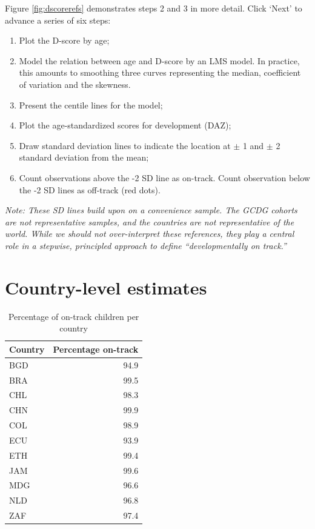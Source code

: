 \documentclass[
]{book}
\providecommand{\tightlist}{%
  \setlength{\itemsep}{0pt}\setlength{\parskip}{0pt}}
\begin{document}
Figure \ref{fig:dscorerefs} demonstrates steps 2 and 3 in more detail. Click `Next' to advance a series of six steps:

\begin{enumerate}
\def\labelenumi{\arabic{enumi}.}
\tightlist
\item
  Plot the D-score by age;
\item
  Model the relation between age and D-score by an LMS model. In practice, this amounts to smoothing three curves representing the median, coefficient of variation and the skewness.
\item
  Present the centile lines for the model;
\item
  Plot the age-standardized scores for development (DAZ);
\item
  Draw standard deviation lines to indicate the location at \(\pm\) 1 and \(\pm\) 2 standard deviation from the mean;
\item
  Count observations above the -2 SD line as on-track. Count observation below the -2 SD lines as off-track (red dots).
\end{enumerate}

\emph{Note: These SD lines build upon on a convenience sample. The GCDG cohorts are not representative samples, and the countries are not representative of the world. While we should not over-interpret these references, they play a central role in a stepwise, principled approach to define ``developmentally on track.''}

\hypertarget{sec:countrytrack}{%
\section{Country-level estimates}\label{sec:countrytrack}}

\begin{table}

\caption{\label{tab:ontrack}Percentage of on-track children per country}
\centering
\begin{tabular}[t]{l|r}
\hline
Country & Percentage on-track\\
\hline
BGD & 94.9\\
\hline
BRA & 99.5\\
\hline
CHL & 98.3\\
\hline
CHN & 99.9\\
\hline
COL & 98.9\\
\hline
ECU & 93.9\\
\hline
ETH & 99.4\\
\hline
JAM & 99.6\\
\hline
MDG & 96.6\\
\hline
NLD & 96.8\\
\hline
ZAF & 97.4\\
\hline
\end{tabular}
\end{table}
\end{document}

